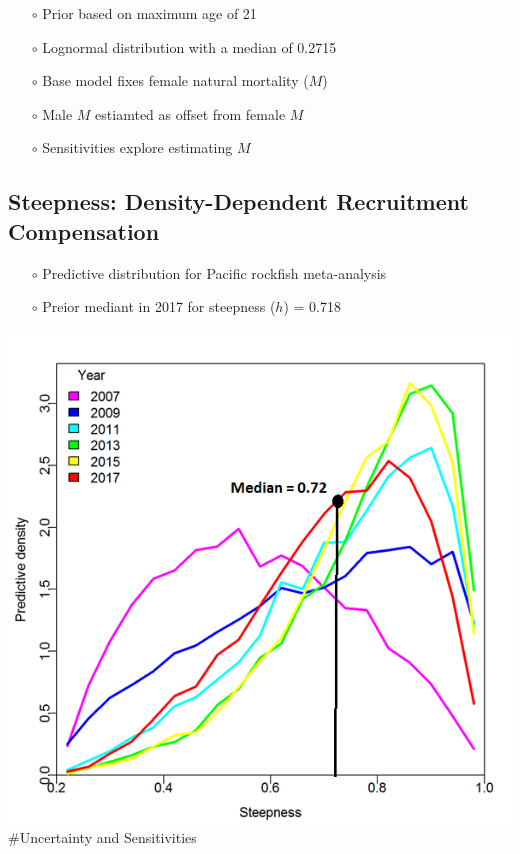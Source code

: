 \documentclass[ignorenonframetext,compress]{beamer}
\begin{document}
\begin{itemize}
\item[$\circ$] Prior based on maximum age of 21
\item[$\circ$] Lognormal distribution with a median of 0.2715
\item[$\circ$] Base model fixes female natural mortality ($M$)
\item[$\circ$] Male $M$ estiamted as offset from female $M$
\item[$\circ$] Sensitivities explore estimating $M$
\end{itemize}

\subsection{Steepness: Density-Dependent Recruitment
Compensation}\label{steepness-density-dependent-recruitment-compensation}

\begin{itemize}
\item[$\circ$] Predictive distribution for Pacific rockfish meta-analysis
\item[$\circ$] Preior mediant in 2017 for steepness ($h$) = 0.718
\end{itemize}

\includegraphics{Figures/h_prior.png} \#Uncertainty and Sensitivities
\end{document}
